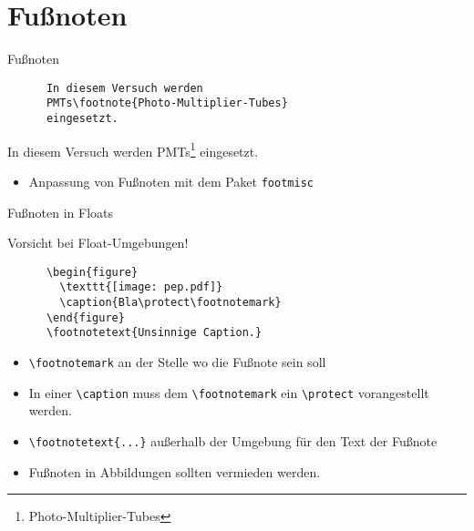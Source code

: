 \section{Fußnoten}

\begin{frame}[fragile]{Fußnoten}
  \begin{CodeExample}{0.5}
    \begin{lstlisting}
      In diesem Versuch werden
      PMTs\footnote{Photo-Multiplier-Tubes}
      eingesetzt.
    \end{lstlisting}
    \CodeResult
      In diesem Versuch werden
      PMTs\footnote{Photo-Multiplier-Tubes}
      eingesetzt.
    \vspace{4cm}
  \end{CodeExample}
  \begin{itemize}
    \item Anpassung von Fußnoten mit dem Paket \texttt{footmisc}
  \end{itemize}
\end{frame}
\begin{frame}[fragile]{Fußnoten in Floats}
  \begin{alertblock}{Vorsicht bei Float-Umgebungen!}
    \begin{lstlisting}
      \begin{figure}
        \texttt{[image: pep.pdf]}
        \caption{Bla\protect\footnotemark}
      \end{figure}
      \footnotetext{Unsinnige Caption.}
    \end{lstlisting}
  \end{alertblock}
  \vspace{-1pt}
  \begin{itemize}
    \item \lstinline+\footnotemark+ an der Stelle wo die Fußnote sein soll
    \item In einer \lstinline+\caption+ muss dem \lstinline+\footnotemark+ ein \lstinline+\protect+ vorangestellt werden.
    \item \lstinline+\footnotetext{...}+ außerhalb der Umgebung für den Text der Fußnote
    \item Fußnoten in Abbildungen sollten vermieden werden.
  \end{itemize}
\end{frame}
